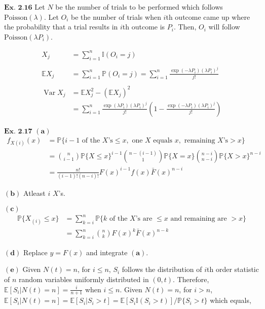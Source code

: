 \documentclass{article}
\begin{document}
\vspace{0.2in}
${\textbf{Ex. 2.16}}$
Let $N$ be the number of trials to be performed which follows $\text{Poisson}(\lambda)$. Let $O_i$ be the number of trials when $i$th outcome came up where the probability that a trial results in $i$th outcome is $P_i$. Then, $O_i$ will follow $\text{Poisson}(\lambda P_i)$.

\begin{align*}
X_j &= \sum_{i=1}^{n}\mathbb{I}(O_i=j)\\\\
\mathbb{E}X_j &= \sum_{i=1}^{n}\mathbb{P}(O_i=j) = \sum_{i=1}^{n}\frac{\exp(-\lambda P_i)(\lambda P_i)^{j}}{j!}\\\\
\operatorname{Var}X_j &= \mathbb{E}X_j^2 - (\mathbb{E}X_j)^2\\
&= \sum_{i=1}^{n}\frac{\exp(\lambda P_i)(\lambda P_i)^{j}}{j!}\left(1 - \frac{\exp(-\lambda P_i)(\lambda P_i)^{j}}{j!}\right)
\end{align*}

\vspace{0.2in}
${\textbf{Ex. 2.17}}$
$\mathbf{(a)}$
\begin{align*}
f_{X(i)}(x) &= \mathbb{P}\{i-1\text{ of the }X \text{'s} \leq x, \text{ one }X \text{ equals }x, \text{ remaining }X\text{'s} > x\}\\
&= \binom{n}{i-1}\mathbb{P}\{X\leq x\}^{i-1} \binom{n-(i-1)}{1}\mathbb{P}\{X=x\} \binom{n-i}{n-i}\mathbb{P}\{X>x\}^{n-i}\\
&= \frac{n!}{(i-1)!(n-i)!}F(x)^{i-1}f(x)\bar{F}(x)^{n-i}
\end{align*}

$\mathbf{(b)}$
Atleast $i$ $X$'s.

$\mathbf{(c)}$
\begin{align*}
\mathbb{P}\{X_{(i)} \leq x\} &= \sum_{k=i}^{n}\mathbb{P}\{k \text{ of the }X\text{'s are } \leq x \text{ and remaining are } > x\}\\
&= \sum_{k=i}^{n}\binom{n}{k}F(x)^{k}\bar{F}(x)^{n-k}
\end{align*}

$\mathbf{(d)}$ Replace $y=F(x)$ and integrate $\mathbf{(a)}$.

$\mathbf{(e)}$ Given $N(t) = n$, for $i \leq n$, $S_i$ follows the distribution of $i$th order statistic of $n$ random variables uniformly distributed in $(0,t)$. Therefore, $\mathbb{E}[S_i | N(t)=n] = \frac{i}{n+1}$ when $i \leq n$. Given $N(t)=n$, for $i > n$, $\mathbb{E}[S_i|N(t)=n] = \mathbb{E}[S_i|S_i>t] = \mathbb{E}[S_i\mathbb{I}(S_i > t)]/\mathbb{P}\{S_i > t\}$ which equals,
\end{document}
